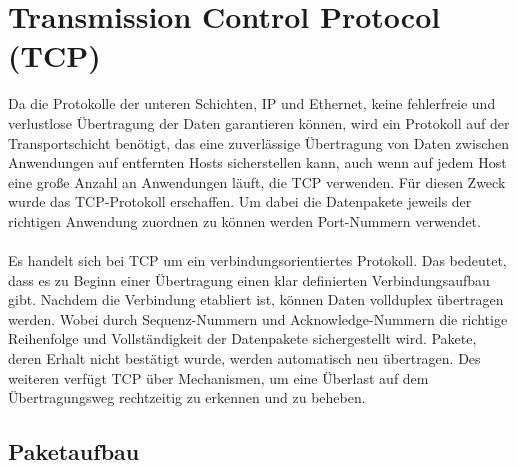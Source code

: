 \FloatBarrier
\section{Transmission Control Protocol (TCP)}
Da die Protokolle der unteren Schichten, IP und Ethernet, keine fehlerfreie und verlustlose Übertragung der Daten garantieren können, wird ein Protokoll auf der Transportschicht benötigt, das eine zuverlässige Übertragung von Daten zwischen Anwendungen auf entfernten Hosts sicherstellen kann, auch wenn auf jedem Host eine große Anzahl an Anwendungen läuft, die TCP verwenden. Für diesen Zweck wurde das TCP-Protokoll erschaffen. Um dabei die Datenpakete jeweils der richtigen Anwendung zuordnen zu können werden Port-Nummern verwendet.\cite{TCPr} \\\\
Es handelt sich bei TCP um ein verbindungsorientiertes Protokoll. Das bedeutet, dass es zu Beginn einer Übertragung einen klar definierten Verbindungsaufbau gibt. Nachdem die Verbindung etabliert ist, können Daten vollduplex übertragen werden. Wobei durch Sequenz-Nummern und Acknowledge-Nummern die richtige Reihenfolge und Vollständigkeit der Datenpakete sichergestellt wird. Pakete, deren Erhalt nicht bestätigt wurde, werden automatisch neu übertragen. Des weiteren verfügt TCP über Mechanismen, um eine Überlast auf dem Übertragungsweg rechtzeitig zu erkennen und zu beheben.\cite{TCPr}   

\subsection{Paketaufbau}



